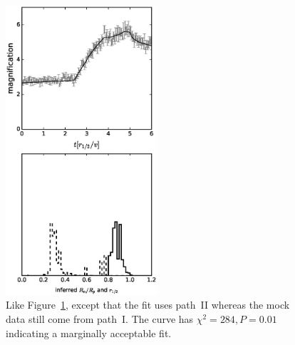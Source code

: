 \documentclass[usenatbib]{mn2e}
\begin{document}
\begin{figure}
\centering
  \includegraphics[width=0.5\textwidth]{figures/cc_backward.eps}
\caption{\label{fig:cc_backward} Like Figure~\ref{fig:cc_backward},
  except that the fit uses path~II whereas the mock data still come
  from path~I. The curve has $\chi^2=284, P=0.01$ indicating a
  marginally acceptable fit.}
\end{figure}
\end{document}
